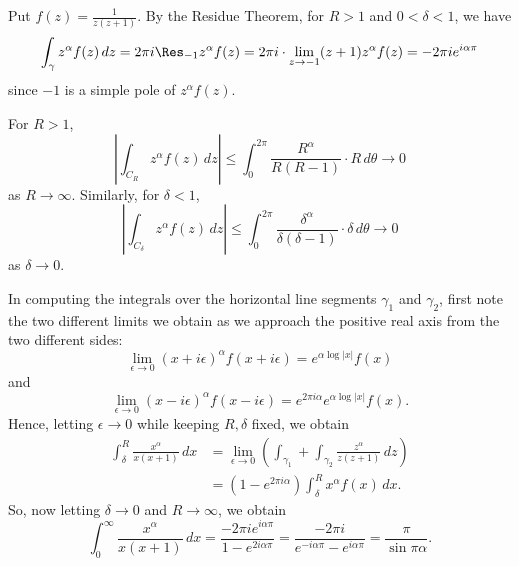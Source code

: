 \documentclass[11pt]{book}
\theoremstyle{definition}
\begin{document}
\begin{enumerate}
    
    Put $f(z) = \frac{1}{z(z+1)}$.   By the Residue Theorem, for $R > 1$ and $0 < \delta < 1$, we have 
    \[ \int_\gamma z^\alpha f(z) \, dz = 2\pi i \Res_{-1} z^\alpha f(z) = 2\pi i \cdot \lim_{z\to -1} (z+1) z^\alpha f(z) = -2\pi i e^{i\alpha \pi} \] since $-1$ is a simple pole of $z^\alpha f(z)$.  

    For $R>1$, 
    \[ \left| \int_{C_R} z^\alpha f(z) \, dz \right| \leq \int_0^{2\pi} \frac{R^\alpha}{R(R-1)} \cdot R \, d\theta \to 0 \] as $R\to \infty$.  Similarly, for $\delta< 1$, 
    \[ \left| \int_{C_\delta} z^\alpha f(z) \, dz \right| \leq \int_0^{2\pi} \frac{\delta^\alpha}{\delta(\delta-1)} \cdot \delta \, d\theta \to 0 \]  as $\delta\to 0$. 

    In computing the integrals over the horizontal line segments $\gamma_1$ and $\gamma_2$, first note the two different limits we obtain as we approach the positive real axis from the two different sides:
    \[ \lim_{\epsilon \to 0} (x+i\epsilon)^\alpha f(x+i\epsilon) = e^{\alpha \log|x|} f(x) \] and 
    \[ \lim_{\epsilon \to 0} (x-i\epsilon)^\alpha f(x-i\epsilon) = e^{2\pi i \alpha} e^{\alpha \log |x|} f(x). \]  Hence, letting $\epsilon \to 0$ while keeping $R,\delta$ fixed, we obtain
    \begin{align*}
      \int_{\delta}^R \frac{x^\alpha}{x(x+1)} \, dx &= \lim_{\epsilon \to 0} \left( \int_{\gamma_1} + \int_{\gamma_2}  \frac{z^\alpha}{z(z+1)} \, dz \right)  \\
      &= (1-e^{2\pi i \alpha}) \int_\delta^R  x^\alpha f(x) \, dx .
    \end{align*}
    So, now letting $\delta\to 0$ and $R\to \infty$, we obtain
    \[ \int_0^\infty \frac{x^\alpha}{x(x+1)} \, dx = \frac{-2\pi i e^{i\alpha \pi}}{1 - e^{2i   \alpha \pi }}  = \frac{-2\pi i}{e^{-i \alpha  \pi } - e^{i \alpha \pi}} = \frac{\pi}{\sin \pi \alpha} . \] 
    


\end{enumerate}
\end{document}
